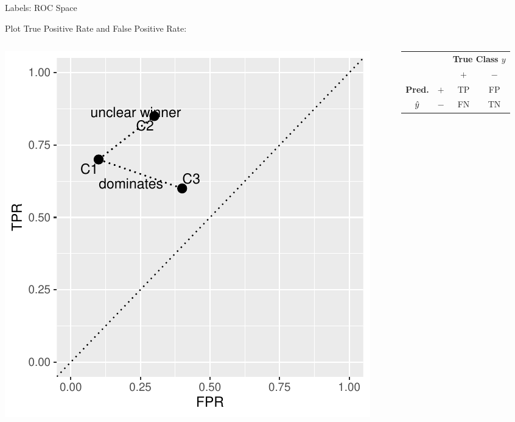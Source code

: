 \documentclass[11pt,compress,t,notes=noshow, xcolor=table]{beamer}
\newenvironment{knitrout}{}{} %
\begin{document}
\begin{vbframe}{Labels: ROC Space}


Plot True Positive Rate and False Positive Rate:
\begin{columns}
\begin{column}{0.5\textwidth}

\begin{knitrout}\scriptsize
{}\color{fgcolor}

{\centering \includegraphics[width=\textwidth]{figure/eval_mclass_roc_sp_1}

}



\end{knitrout}

\end{column}
\begin{column}{0.5\textwidth}

\begin{center}
\small
\begin{tabular}{cc|cc}
    & & \multicolumn{2}{c}{\bfseries True Class $y$} \\
    & & $+$ & $-$ \\
    \hline
    \bfseries Pred.     & $+$ & TP & FP \\
              $\hat{y}$ & $-$ & FN & TN \\
\end{tabular}


\end{center}
\end{column}
\end{columns}
\end{vbframe}
\end{document}
